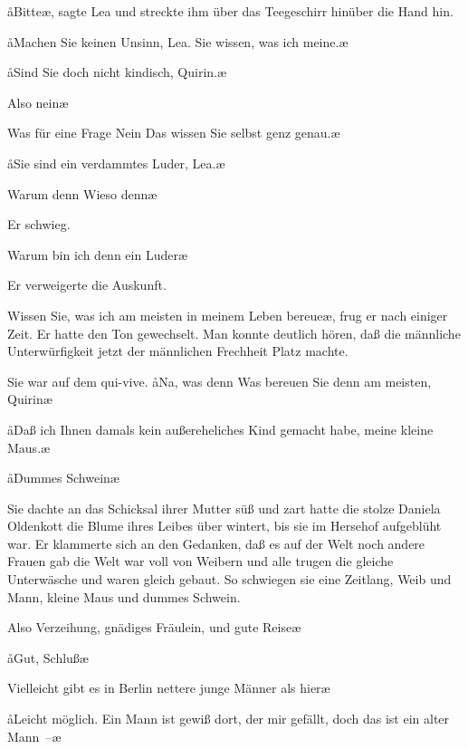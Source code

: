 \aa Bitte\ae, sagte Lea und streckte ihm über das Teegeschirr hinüber
die Hand hin.

\aa Machen Sie keinen Unsinn, Lea. Sie wissen, was ich
meine.\ae

\aa Sind Sie doch nicht kindisch, Quirin.\ae

\aanah Also nein\frag\ae

\aanah Was für eine Frage\ausr{} Nein\ausr{} Das wissen Sie selbst genz
genau.\ae

\aa Sie sind ein verdammtes Luder, Lea.\ae

\aanah Warum denn\frag{} Wieso denn\frag\ae

Er schwieg.

\aanah Warum bin ich denn ein Luder\frag\ae

Er verweigerte die Auskunft.

\aanah Wissen Sie, was ich am meisten in meinem Leben bereue\ae,
frug er nach einiger Zeit. Er hatte den Ton gewechselt. Man
konnte deutlich hören, daß die männliche Unterwürfigkeit jetzt
der männlichen Frechheit Platz machte.

Sie war auf dem qui-vive. \aa Na, was denn\frag{} Was bereuen
Sie denn am meisten, Quirin\frag\ae

\aa Daß ich Ihnen damals kein außereheliches Kind gemacht
habe, meine kleine Maus.\ae

\aa Dummes Schwein\ausr\ae

Sie dachte an das Schicksal ihrer Mutter\dopp{} süß und zart hatte
die stolze Daniela Oldenkott die Blume ihres Leibes über\-%
wintert, bis sie im Hersehof aufgeblüht war. Er klammerte
sich an den Gedanken, daß es auf der Welt noch andere Frauen
gab\dopp{} die Welt war voll von Weibern und alle trugen die gleiche
Unterwäsche und waren gleich gebaut. So schwiegen sie eine
Zeitlang, Weib und Mann, kleine Maus und dummes
Schwein.

\aanah Also Verzeihung, gnädiges Fräulein, und gute Reise\ausr\ae

\aa Gut, Schluß\ausr\ae

\aanah Vielleicht gibt es in Berlin nettere junge Männer als hier\frag\ae

\aa Leicht möglich. Ein Mann ist gewiß dort, der mir gefällt,
doch das ist ein alter Mann~--\ae

